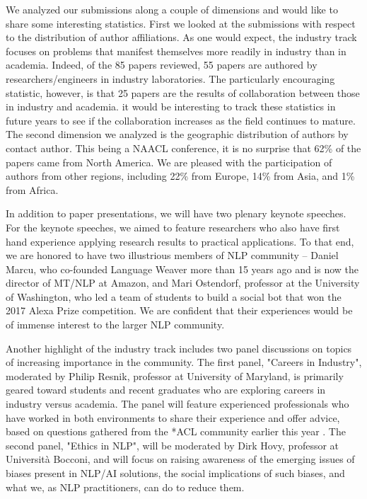 We analyzed our submissions along a couple of dimensions and would like to share some interesting statistics. First we looked at the submissions with respect to the distribution of author affiliations. As one would expect, the industry track focuses on problems that manifest themselves more readily in industry than in academia. Indeed, of the 85 papers reviewed, 55 papers are authored by researchers/engineers in industry laboratories. The particularly encouraging statistic, however, is that 25 papers are the results of collaboration between those in industry and academia. it would be interesting to track these statistics in future years to see if the collaboration increases as the field continues to mature. The second dimension we analyzed is the geographic distribution of authors by contact author. This being a NAACL conference, it is no surprise that 62\% of the papers came from North America. We are pleased with the participation of authors from other regions, including 22\% from Europe, 14\% from Asia, and 1\% from Africa. 

In addition to paper presentations, we will have two plenary keynote speeches. For the keynote speeches, we aimed to feature researchers who also have first hand experience applying research results to practical applications. To that end, we are honored to have two illustrious members of NLP community --  Daniel Marcu, who co-founded Language Weaver more than 15 years ago and is now the director of MT/NLP at Amazon, and Mari Ostendorf, professor at the University of Washington, who led a team of students to build a social bot that won the 2017 Alexa Prize competition. We are confident that their experiences would be of immense interest to the larger NLP community.

Another highlight of the industry track includes two panel discussions on topics of increasing importance in the community. The first panel, "Careers in Industry", moderated by Philip Resnik, professor at University of Maryland, is primarily geared toward students and recent graduates who are exploring careers in industry versus academia. The panel will feature experienced professionals who have worked in both environments to share their experience and offer advice, based on questions gathered from the *ACL community earlier this year . The second panel, "Ethics in NLP", will be moderated by Dirk Hovy, professor at Università Bocconi, and will focus on raising awareness of the emerging issues of biases present in NLP/AI solutions, the social implications of such biases, and what we, as NLP practitioners, can do to reduce them. 


